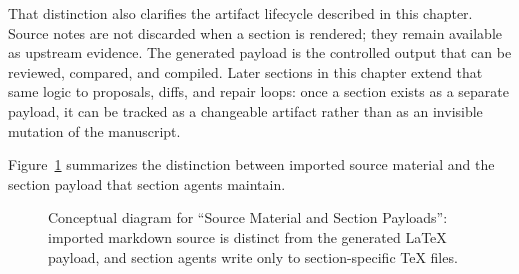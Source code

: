 \documentclass[11pt]{article}
\begin{document}
That distinction also clarifies the artifact lifecycle described in this chapter. Source notes are not discarded when a section is rendered; they remain available as upstream evidence. The generated payload is the controlled output that can be reviewed, compared, and compiled. Later sections in this chapter extend that same logic to proposals, diffs, and repair loops: once a section exists as a separate payload, it can be tracked as a changeable artifact rather than as an invisible mutation of the manuscript.

Figure~\ref{fig:ch07_sec01_section_payloads} summarizes the distinction between imported source material and the section payload that section agents maintain.

\begin{figure}[htbp]
\centering

\caption{Conceptual diagram for ``Source Material and Section Payloads'': imported markdown source is distinct from the generated LaTeX payload, and section agents write only to section-specific TeX files.}
\label{fig:ch07_sec01_section_payloads}
\end{figure}
\end{document}
